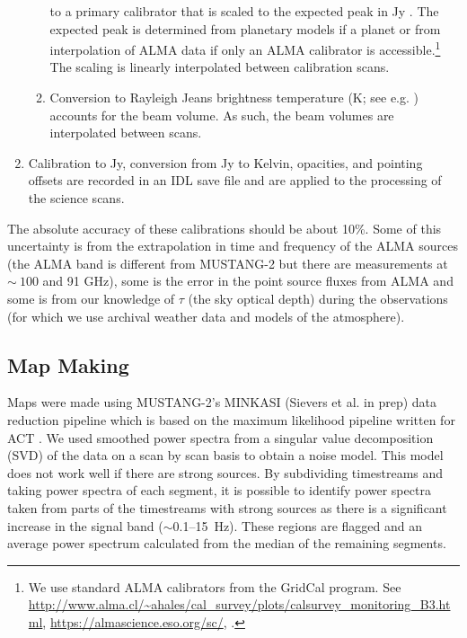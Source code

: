 \documentclass[twocolumn]{aastex62}
\def\todo#1{{\textcolor{red}{TODO: #1}}}
\newcommand{\MUSTANG}{MUSTANG-2\xspace}
\begin{document}
\begin{enumerate}
\begin{enumerate}
                to a primary calibrator that is scaled to the expected
                peak in Jy \perbeam.  The expected peak is determined from
                planetary models if a planet or from interpolation of ALMA data
                if only an ALMA calibrator is accessible.\footnote{We use
                standard ALMA calibrators from the GridCal program.  See
                \url{http://www.alma.cl/~ahales/cal_survey/plots/calsurvey_monitoring_B3.html},
                \url{https://almascience.eso.org/sc/}, \cite{vanKempen2014}.}
                The scaling is
                linearly interpolated between calibration scans.
            \item Conversion to Rayleigh Jeans brightness temperature (K; see e.g. \citealt{Condon2016a}) accounts for the beam volume. As such,
                the beam volumes are interpolated between scans.
        \end{enumerate}
    \item Calibration to Jy, conversion from Jy \perbeam to Kelvin, opacities,
        and pointing offsets are recorded in an IDL save file and are
        applied to the processing of the science scans.
\end{enumerate}

The absolute accuracy of these calibrations should be about 10\%.
Some of this uncertainty is from the extrapolation in time and frequency of the ALMA
sources (the ALMA band is different from \MUSTANG but there are measurements at
$\sim~100$ and 91 GHz), some is the error in the point source fluxes from ALMA and
some is from our knowledge of $\tau$ (the sky optical depth) during the observations (for which we use archival weather data and models of the atmosphere). 

\subsection{Map Making}
Maps were made using \MUSTANG's MINKASI (Sievers et al. in prep) data reduction
pipeline which is based on the maximum likelihood pipeline written for ACT \cite{Dunner2013a}.
We used smoothed power spectra from a singular value decomposition (SVD) of the
data on a scan by scan basis to obtain a noise model.
This model does not work well if there are strong sources.
By subdividing timestreams and taking power spectra of each segment, it is
possible to identify power spectra taken from parts of the timestreams with
strong sources as there is 
a significant increase in the signal band ($\sim$0.1--15~Hz). These regions are
flagged and an average power spectrum calculated from the median of the
remaining segments. 
\end{document}
